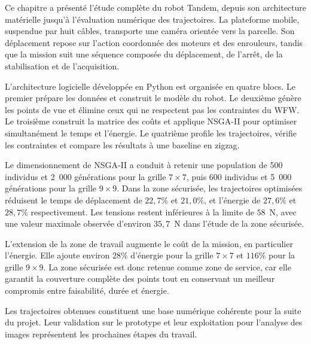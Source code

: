 Ce chapitre a présenté l'étude complète du robot Tandem, depuis son architecture matérielle jusqu'à l'évaluation numérique des trajectoires. La plateforme mobile, suspendue par huit câbles, transporte une caméra orientée vers la parcelle. Son déplacement repose sur l'action coordonnée des moteurs et des enrouleurs, tandis que la mission suit une séquence composée du déplacement, de l'arrêt, de la stabilisation et de l'acquisition.

L'architecture logicielle développée en Python est organisée en quatre blocs. Le premier prépare les données et construit le modèle du robot. Le deuxième génère les points de vue et élimine ceux qui ne respectent pas les contraintes du WFW. Le troisième construit la matrice des coûts et applique NSGA-II pour optimiser simultanément le temps et l'énergie. Le quatrième profile les trajectoires, vérifie les contraintes et compare les résultats à une baseline en zigzag.

Le dimensionnement de NSGA-II a conduit à retenir une population de 500 individus et 2~000 générations pour la grille $7\times7$, puis 600 individus et 5~000 générations pour la grille $9\times9$. Dans la zone sécurisée, les trajectoires optimisées réduisent le temps de déplacement de $22{,}7\%$ et $21{,}0\%$, et l'énergie de $27{,}6\%$ et $28{,}7\%$ respectivement. Les tensions restent inférieures à la limite de $58$~N, avec une valeur maximale observée d'environ $35{,}7$~N dans l'étude de la zone sécurisée.

L'extension de la zone de travail augmente le coût de la mission, en particulier l'énergie. Elle ajoute environ $28\%$ d'énergie pour la grille $7\times7$ et $116\%$ pour la grille $9\times9$. La zone sécurisée est donc retenue comme zone de service, car elle garantit la couverture complète des points tout en conservant un meilleur compromis entre faisabilité, durée et énergie.

Les trajectoires obtenues constituent une base numérique cohérente pour la suite du projet. Leur validation sur le prototype et leur exploitation pour l'analyse des images représentent les prochaines étapes du travail.
